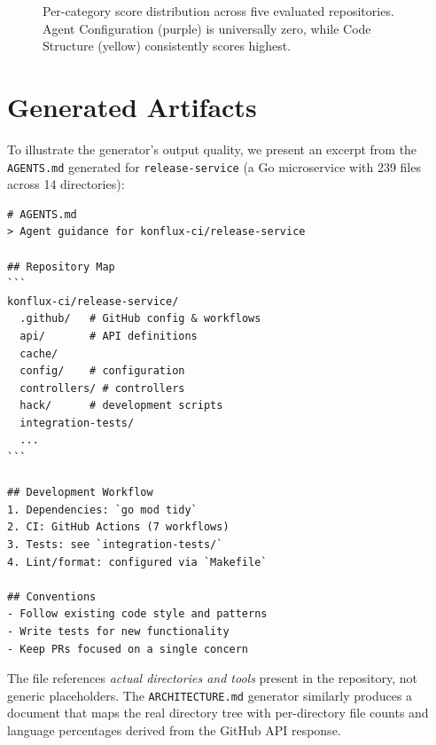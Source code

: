 \documentclass[11pt,twocolumn]{article}
\begin{document}
\begin{figure}[H]
\caption{Per-category score distribution across five evaluated
repositories. Agent Configuration (purple) is universally zero,
while Code Structure (yellow) consistently scores highest.}
\label{fig:scores}
\end{figure}

\section{Generated Artifacts}
\label{sec:artifacts}

To illustrate the generator's output quality, we present an excerpt from
the \texttt{AGENTS.md} generated for \texttt{release-service} (a Go
microservice with 239 files across 14 directories):

\begin{lstlisting}[language={},caption={Generated AGENTS.md excerpt},label={lst:agents}]
# AGENTS.md
> Agent guidance for konflux-ci/release-service

## Repository Map
```
konflux-ci/release-service/
  .github/   # GitHub config & workflows
  api/       # API definitions
  cache/
  config/    # configuration
  controllers/ # controllers
  hack/      # development scripts
  integration-tests/
  ...
```

## Development Workflow
1. Dependencies: `go mod tidy`
2. CI: GitHub Actions (7 workflows)
3. Tests: see `integration-tests/`
4. Lint/format: configured via `Makefile`

## Conventions
- Follow existing code style and patterns
- Write tests for new functionality
- Keep PRs focused on a single concern
\end{lstlisting}

\noindent The file references \emph{actual directories and tools}
present in the repository, not generic placeholders. The
\texttt{ARCHITECTURE.md} generator similarly produces a document
that maps the real directory tree with per-directory file counts and
language percentages derived from the GitHub API response.
\end{document}

